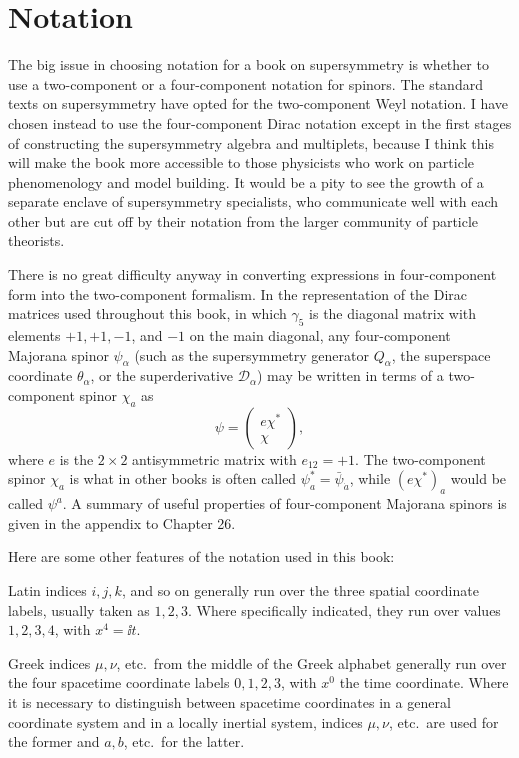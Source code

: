 \section*{Notation}


The big issue in choosing notation for a book on supersymmetry is whether to
use a two-component or a four-component notation for spinors. The standard
texts on supersymmetry have opted for the two-component Weyl notation. I have
chosen instead to use the four-component Dirac notation except in the first
stages of constructing the supersymmetry algebra and multiplets, because I
think this will make the book more accessible to those physicists who work on
particle phenomenology and model building. It would be a pity to see the
growth of a separate enclave of supersymmetry specialists, who communicate
well with each other but are cut off by their notation from the larger
community of particle theorists.

There is no great difficulty anyway in converting expressions in
four-component form into the two-component formalism. In the representation
of the Dirac matrices used throughout this book, in which \(\gamma_5\) is the
diagonal matrix with elements \(+1,+1,-1\), and \(-1\) on the main diagonal,
any four-component Majorana spinor \(\psi_\alpha\) (such as the supersymmetry
generator \(Q_\alpha\), the superspace coordinate \(\theta_\alpha\), or the
superderivative \(\mathcal{D}_\alpha\)) may be written in terms of a
two-component spinor \(\chi_a\) as
\[
  \psi=
  \begin{pmatrix}
    e\chi^*\\
    \chi
  \end{pmatrix},
\]
where \(e\) is the \(2\times2\) antisymmetric matrix with \(e_{12}=+1\). The
two-component spinor \(\chi_a\) is what in other books is often called
\(\psi_a^*=\bar{\psi}_{\dot a}\), while \((e\chi^*)_a\) would be called
\(\psi^a\). A summary of useful properties of four-component Majorana spinors
is given in the appendix to Chapter 26.

Here are some other features of the notation used in this book:

Latin indices \(i,j,k\), and so on generally run over the three spatial
coordinate labels, usually taken as \(1,2,3\). Where specifically indicated,
they run over values \(1,2,3,4\), with \(x^4=\ii t\).

Greek indices \(\mu,\nu\), etc.\ from the middle of the Greek alphabet
generally run over the four spacetime coordinate labels \(0,1,2,3\), with
\(x^0\) the time coordinate. Where it is necessary to distinguish between
spacetime coordinates in a general coordinate system and in a locally inertial
system, indices \(\mu,\nu\), etc.\ are used for the former and \(a,b\), etc.\
for the latter.


